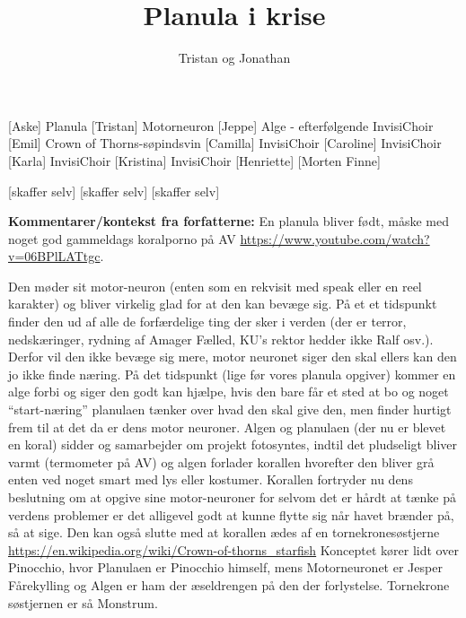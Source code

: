 \documentclass[a4paper,11pt]{article}
\title{Planula i krise}
\author{Tristan og Jonathan}
\begin{document}
\maketitle

\begin{roles}
    [Aske] Planula 
    [Tristan] Motorneuron 
    [Jeppe] Alge - efterfølgende InvisiChoir
    [Emil] Crown of Thorns-søpindsvin 
    [Camilla] InvisiChoir
    [Caroline] InvisiChoir
    [Karla] InvisiChoir
    [Kristina] InvisiChoir
    [Henriette]
    [Morten Finne]
\end{roles}

\begin{props}
    [skaffer selv]
    [skaffer selv]
     [skaffer selv]
\end{props}

\textbf{Kommentarer/kontekst fra forfatterne:}
En planula bliver født, måske med noget god gammeldags koralporno på AV
\url{https://www.youtube.com/watch?v=06BPlLATtgc}.

Den møder sit motor-neuron (enten som en rekvisit med speak eller en reel karakter) og bliver virkelig glad for at den kan bevæge sig. På et et tidspunkt finder den ud af alle de forfærdelige ting der sker i verden (der er terror, nedskæringer, rydning af Amager Fælled, KU’s rektor hedder ikke Ralf osv.).
Derfor vil den ikke bevæge sig mere, motor neuronet siger den skal ellers kan den jo ikke finde næring. På det tidspunkt (lige før vores planula opgiver) kommer en alge forbi og siger den godt kan hjælpe, hvis den bare får et sted at bo og noget “start-næring” planulaen tænker over hvad den skal give den, men finder hurtigt frem til at det da er dens motor neuroner. Algen og planulaen (der nu er blevet en koral) sidder og samarbejder om projekt fotosyntes, indtil det pludseligt bliver varmt (termometer på AV) og algen forlader korallen hvorefter den bliver grå enten ved noget smart med lys eller kostumer. Korallen fortryder nu dens beslutning om at opgive sine motor-neuroner for selvom det er hårdt at tænke på verdens problemer er det alligevel godt at kunne flytte sig når havet brænder på, så at sige. Den kan også slutte med at korallen ædes af en tornekronesøstjerne
\url{https://en.wikipedia.org/wiki/Crown-of-thorns_starfish}
Konceptet kører lidt over Pinocchio, hvor Planulaen er Pinocchio himself, mens Motorneuronet er Jesper Fårekylling og Algen er ham der æseldrengen på den der forlystelse. Tornekrone søstjernen er så Monstrum.
\end{document}
